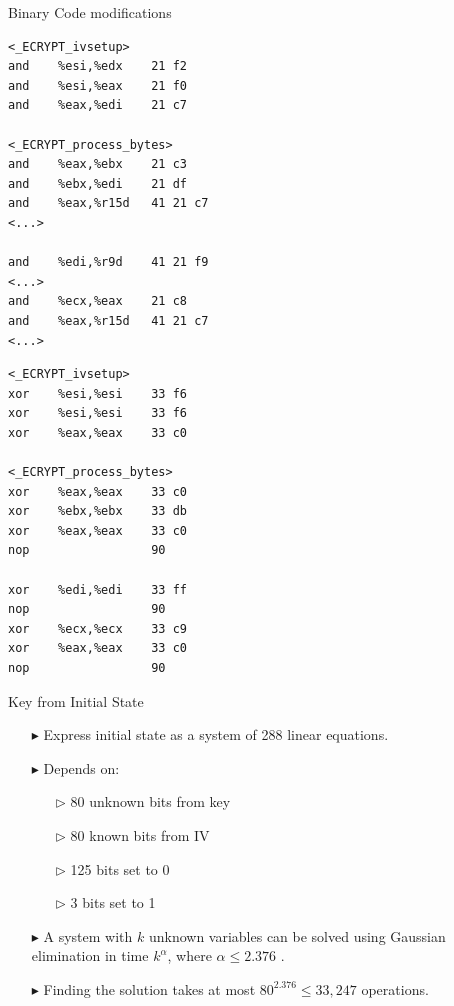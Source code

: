 \documentclass[10pt, compress]{beamer}
\begin{document}
\begin{frame}[fragile]{Binary Code modifications}
\noindent\begin{minipage}{.45\textwidth}
\begin{lstlisting}[style=asm, caption=Original,frame=tlrb]
<_ECRYPT_ivsetup>
and    %esi,%edx    21 f2
and    %esi,%eax    21 f0
and    %eax,%edi    21 c7

<_ECRYPT_process_bytes>
and    %eax,%ebx    21 c3
and    %ebx,%edi    21 df  
and    %eax,%r15d   41 21 c7
<...>

and    %edi,%r9d    41 21 f9
<...>
and    %ecx,%eax    21 c8
and    %eax,%r15d   41 21 c7
<...>
\end{lstlisting}
\end{minipage}\hfill
\begin{minipage}{.45\textwidth}
\begin{lstlisting}[style=asm, caption=Modified,frame=tlrb]
<_ECRYPT_ivsetup>
xor    %esi,%esi    33 f6
xor    %esi,%esi    33 f6
xor    %eax,%eax    33 c0

<_ECRYPT_process_bytes>
xor    %eax,%eax    33 c0
xor    %ebx,%ebx    33 db 
xor    %eax,%eax    33 c0
nop                 90

xor    %edi,%edi    33 ff
nop                 90
xor    %ecx,%ecx    33 c9
xor    %eax,%eax    33 c0
nop                 90
\end{lstlisting}
\end{minipage}
\end{frame}

\begin{frame}{Key from Initial State}
\begin{itemize}[itemsep=0.5cm]
\item[$\blacktriangleright$] Express initial state as a system of 288 linear equations.
\item[$\blacktriangleright$] Depends on:
\begin{itemize}
\item[$\triangleright$] 80 unknown bits from key
\item[$\triangleright$] 80 known bits from IV
\item[$\triangleright$] 125 bits set to 0
\item[$\triangleright$] 3 bits set to 1
\end{itemize}
\item[$\blacktriangleright$] A system with $k$ unknown variables can be solved using Gaussian elimination in time $k^\alpha$, where $\alpha\leq 2.376$ \cite{gauss}.
\item[$\blacktriangleright$] Finding the solution takes at most $80^{2.376} \leq 33,247$ operations.
\end{itemize}
\end{frame}
\end{document}
